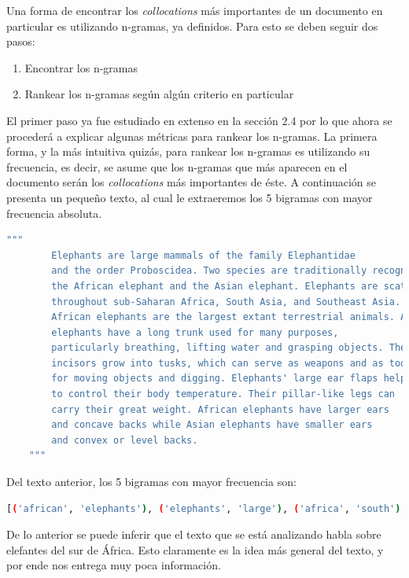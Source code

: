     Una forma de encontrar los \textit{collocations} más importantes de un documento en particular es utilizando n-gramas, ya definidos. Para esto se deben seguir dos pasos:
    \begin{enumerate}
        \item Encontrar los n-gramas 
        \item Rankear los n-gramas según algún criterio en particular
    \end{enumerate}
    El primer paso ya fue estudiado en extenso en la sección 2.4 por lo que ahora se procederá a explicar algunas métricas para rankear los n-gramas. La primera forma, y la más intuitiva quizás, para rankear los n-gramas es utilizando su frecuencia, es decir, se asume que los n-gramas que más aparecen en el documento serán los \textit{collocations} más importantes de éste. A continuación se presenta un pequeño texto, al cual le extraeremos los 5 bigramas con mayor frecuencia absoluta.
    
    \begin{lstlisting}[language=Bash]
    """
        Elephants are large mammals of the family Elephantidae
        and the order Proboscidea. Two species are traditionally recognised,
        the African elephant and the Asian elephant. Elephants are scattered
        throughout sub-Saharan Africa, South Asia, and Southeast Asia. Male
        African elephants are the largest extant terrestrial animals. All
        elephants have a long trunk used for many purposes,
        particularly breathing, lifting water and grasping objects. Their
        incisors grow into tusks, which can serve as weapons and as tools
        for moving objects and digging. Elephants' large ear flaps help
        to control their body temperature. Their pillar-like legs can
        carry their great weight. African elephants have larger ears
        and concave backs while Asian elephants have smaller ears
        and convex or level backs.
    """
    \end{lstlisting}
    Del texto anterior, los 5 bigramas con mayor frecuencia son:
    \begin{lstlisting}[language=Bash]
    [('african', 'elephants'), ('elephants', 'large'), ('africa', 'south'), ('african', 'elephant'), ('animals', 'elephants')]
    \end{lstlisting}
    
    De lo anterior se  puede inferir que el texto que se está analizando habla sobre elefantes del sur de África. Esto claramente es la idea más general del texto, y por ende nos entrega muy poca información. 
    
